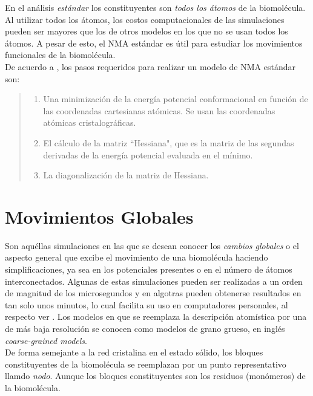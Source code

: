 En el an\'{a}lisis \textit{est\'{a}ndar} los constituyentes son \textit{todos los \'{a}tomos} de la biomol\'{e}cula. Al utilizar todos los \'{a}tomos, los costos computacionales de las simulaciones pueden ser mayores que los de otros modelos en los que no se usan todos los \'{a}tomos. A pesar de esto, el NMA est\'{a}ndar es \'{u}til para estudiar los movimientos funcionales de la biomol\'{e}cula.\\

De acuerdo a \cite{Hayward2008}, los pasos requeridos para realizar un modelo de NMA est\'{a}ndar son:
\begin{quote}
 \begin{enumerate}
  \item Una minimizaci\'{o}n de la energ\'{i}a potencial conformacional en funci\'{o}n de las coordenadas cartesianas at\'{o}micas. Se usan las coordenadas at\'{o}micas cristalogr\'{a}ficas.
  \item El c\'{a}lculo de la matriz ``Hessiana", que es la matriz de las segundas derivadas de la energ\'{i}a potencial evaluada en el m\'{i}nimo. 
  \item La diagonalizaci\'{o}n de la matriz de Hessiana.
 \end{enumerate}
\end{quote}


\section{Movimientos Globales}

Son aqu\'{e}llas simulaciones en las que se desean conocer los \textit{cambios globales} o el aspecto general que excibe el movimiento de una biomol\'{e}cula haciendo simplificaciones, ya sea en los potenciales presentes o en el n\'{u}mero de \'{a}tomos interconectados. Algunas de estas simulaciones pueden ser realizadas a un orden de magnitud de los microsegundos y en algotras pueden obtenerse resultados en tan solo unos minutos, lo cual facilita su uso en computadores personales, al respecto ver \cite{Gur2013}. Los modelos en que se reemplaza la descripci\'{o}n atom\'{i}stica por una de m\'{a}s baja resoluci\'{o}n se conocen como modelos de grano grueso, en ingl\'{e}s \textit{coarse-grained models}.\\

De forma semejante a la red cristalina en el estado s\'{o}lido, los bloques constituyentes de la biomol\'{e}cula se reemplazan  por un punto representativo llamdo \textit{nodo}. Aunque los bloques constituyentes son los residuos (mon\'{o}meros) de la biomol\'{e}cula.\\

